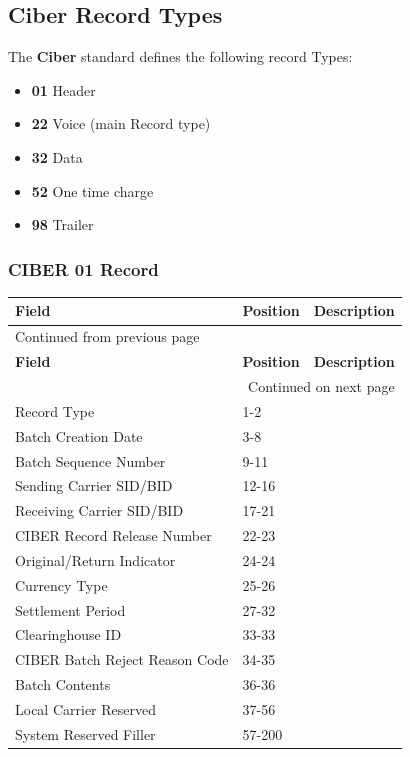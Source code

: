 \documentclass[12pt,twoside]{article}
\begin{document}
\subsection{Ciber Record Types}
\label{sec:orgheadline24}
The \textbf{Ciber} standard defines the following record Types:
\begin{itemize}
\item \textbf{01} Header
\item \textbf{22} Voice (main Record type)
\item \textbf{32} Data
\item \textbf{52} One time charge
\item \textbf{98} Trailer
\end{itemize}

\subsubsection{CIBER 01 Record}
\label{sec:orgheadline19}
\footnotesize

\begin{longtable}{l|l|l}
\hline
\textbf{Field} & \textbf{Position} & \textbf{Description}\\
\hline
\endfirsthead
\multicolumn{3}{l}{Continued from previous page} \\
\hline

\textbf{Field} & \textbf{Position} & \textbf{Description} \\

\hline
\endhead
\hline\multicolumn{3}{r}{Continued on next page} \\
\endfoot
\endlastfoot
\hline
Record Type & 1-2 & \\
Batch Creation Date & 3-8 & \\
Batch Sequence Number & 9-11 & \\
Sending Carrier SID/BID & 12-16 & \\
Receiving Carrier SID/BID & 17-21 & \\
CIBER Record Release Number & 22-23 & \\
Original/Return Indicator & 24-24 & \\
Currency Type & 25-26 & \\
Settlement Period & 27-32 & \\
Clearinghouse ID & 33-33 & \\
CIBER Batch Reject Reason Code & 34-35 & \\
Batch Contents & 36-36 & \\
Local Carrier Reserved & 37-56 & \\
System Reserved Filler & 57-200 & \\
\hline
\end{longtable}
\end{document}

